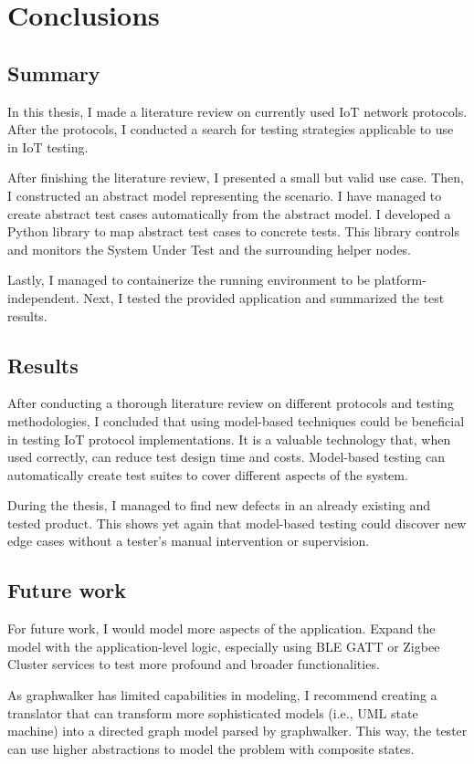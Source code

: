 \chapter{Conclusions}
\label{chap:conclusion}
\section{Summary}
\label{sec:conc:summ}
In this thesis, I made a literature review on currently used IoT network protocols. After the protocols, I conducted a search for testing strategies applicable to use in IoT testing.

After finishing the literature review, I presented a small but valid use case. Then, I constructed an abstract model representing the scenario. I have managed to create abstract test cases automatically from the abstract model. I developed a Python library to map abstract test cases to concrete tests. This library controls and monitors the System Under Test and the surrounding helper nodes.

Lastly, I managed to containerize the running environment to be platform-independent. Next, I tested the provided application and summarized the test results.

\section{Results}
\label{sec:conc:disc}
After conducting a thorough literature review on different protocols and testing methodologies, I concluded that using model-based techniques could be beneficial in testing IoT protocol implementations. It is a valuable technology that, when used correctly, can reduce test design time and costs. Model-based testing can automatically create test suites to cover different aspects of the system.

During the thesis, I managed to find new defects in an already existing and tested product. This shows yet again that model-based testing could discover new edge cases without a tester's manual intervention or supervision.

\section{Future work}
\label{sec:conc:future}
For future work, I would model more aspects of the application. Expand the model with the application-level logic, especially using BLE GATT or Zigbee Cluster services to test more profound and broader functionalities.

As graphwalker has limited capabilities in modeling, I recommend creating a translator that can transform more sophisticated models (i.e., UML state machine) into a directed graph model parsed by graphwalker. This way, the tester can use higher abstractions to model the problem with composite states.